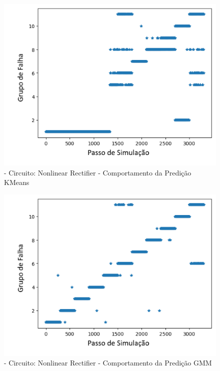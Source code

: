        
        
        \begin{figure}[H]
        \begin{center}
        \includegraphics[width=13cm]{./01_Pre_textuais/nonlin_figs/KMeans_Nonlinear_Rectfier_+_4bit_PRBS_[FALHA]_-_300_-_02sraw.png}
        \caption{\label{fig:DecisionTreeClassifieSalenkey}- Circuito: Nonlinear Rectifier - Comportamento da Predição KMeans }
        \end{center}
        \end{figure}
        
        \begin{figure}[H]
        \begin{center}
        \includegraphics[width=13cm]{./01_Pre_textuais/nonlin_figs/GMM_Nonlinear_Rectfier_+_4bit_PRBS_[FALHA]_-_300_-_02sraw.png}
        \caption{\label{fig:DecisionTreeClassifieSalenkey}- Circuito: Nonlinear Rectifier - Comportamento da Predição GMM }
        \end{center}
        \end{figure}
    